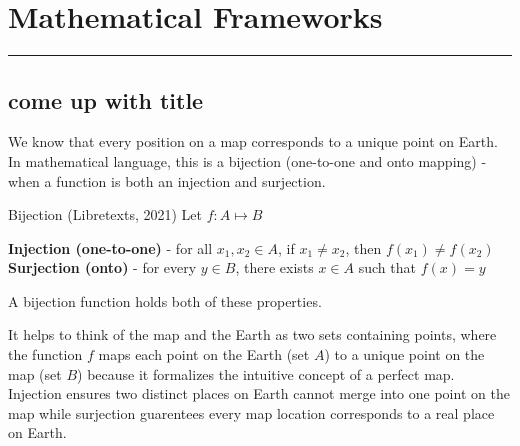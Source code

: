 \section{Mathematical Frameworks}
\hrule height 1pt
\vspace*{5pt}

\subsection{come up with title}
\vspace*{-10pt}
We know that every position on a map corresponds to a unique point on
Earth. In mathematical language, this is a bijection (one-to-one and onto mapping)
 - when a function is both an injection and surjection. 
\begin{definition}{Bijection (Libretexts, 2021)}
    Let $f:A\mapsto B$
    
    \begin{center}
        \textbf{Injection (one-to-one)} - for all $x_1, x_2 \in A$, if $x_1\neq x_2$, then $f(x_1)\neq f(x_2)$\\
        \textbf{Surjection (onto)} - for every $y\in B$, there exists $x\in A$ such that $f(x)=y$\\
    \end{center}

    A bijection function holds both of these properties.
\end{definition}
It helps to think of the map and the Earth as two sets containing points, where the function 
$f$ maps each point on the Earth (set $A$) to a unique point on the map (set $B$) because it 
formalizes the intuitive concept of a perfect map. Injection ensures two distinct places on Earth
cannot merge into one point on the map while surjection guarentees every map location corresponds to
a real place on Earth. 

